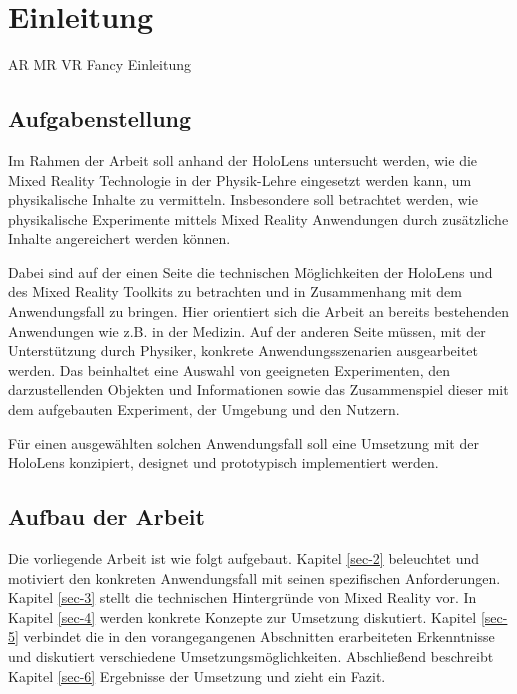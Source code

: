 \section{Einleitung}
\label{sec-1}
AR MR VR Fancy Einleitung 


\subsection{Aufgabenstellung}
\label{sec-1-1}
Im Rahmen der Arbeit soll anhand der HoloLens untersucht werden, wie die Mixed Reality Technologie in der Physik-Lehre eingesetzt werden kann, um physikalische Inhalte zu vermitteln. Insbesondere soll betrachtet werden, wie physikalische Experimente mittels Mixed Reality Anwendungen durch zusätzliche Inhalte angereichert werden können.

Dabei sind auf der einen Seite die technischen Möglichkeiten der HoloLens und des Mixed Reality Toolkits zu betrachten und in Zusammenhang mit dem Anwendungsfall zu bringen. Hier orientiert sich die Arbeit an bereits bestehenden Anwendungen wie z.B. in der Medizin. Auf der anderen Seite müssen, mit der Unterstützung durch Physiker, konkrete Anwendungsszenarien ausgearbeitet werden. Das beinhaltet eine Auswahl von geeigneten Experimenten, den darzustellenden Objekten und Informationen sowie das Zusammenspiel dieser mit dem aufgebauten Experiment, der Umgebung und den Nutzern.

Für einen ausgewählten solchen Anwendungsfall soll eine Umsetzung mit der HoloLens konzipiert, designet und prototypisch implementiert werden.

\subsection{Aufbau der Arbeit}
\label{sec-1-2}

Die vorliegende Arbeit ist wie folgt aufgebaut. Kapitel \ref{sec-2} beleuchtet und motiviert den konkreten Anwendungsfall mit seinen spezifischen Anforderungen. Kapitel \ref{sec-3} stellt die technischen Hintergründe von Mixed Reality vor. In Kapitel \ref{sec-4} werden konkrete Konzepte zur Umsetzung diskutiert. Kapitel \ref{sec-5} verbindet die in den vorangegangenen Abschnitten erarbeiteten Erkenntnisse und diskutiert verschiedene Umsetzungsmöglichkeiten. Abschließend beschreibt Kapitel \ref{sec-6} Ergebnisse der Umsetzung und zieht ein Fazit.